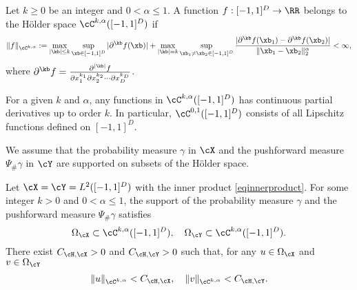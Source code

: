 \documentclass[11pt]{article} %
\begin{document}


\begin{definition}
	Let $k\geq 0$ be an integer and $0<\alpha\leq 1$. A function $f: [-1,1]^D\rightarrow \RR$ belongs to the H\"{o}lder space $\cC^{k,\alpha}([-1,1]^D)$ if
	\begin{align*}
		\|f\|_{\cC^{k,\alpha}}:= \max_{|\kb|\leq k}\sup\limits_{ \xb \in [-1,1]^D} |\partial^{\kb}f (\xb)| + \max\limits_{|\kb|=k}
		\sup\limits_{ \xb_1\neq \xb_2 \in [-1,1]^D}\frac{|\partial^{\kb}f(\xb_1)- \partial^{\kb}f (\xb_2)|}{\|\xb_1-\xb_2\|_2^{\alpha}} < \infty,
	\end{align*}
where $\partial^{\kb}f=\frac{\partial^{|\kb|} f}{\partial x_1^{k_1} \partial x_2^{k_2} \cdots \partial x_D^{k_D}}$.
\end{definition}

For a given $k$ and $\alpha$, any functions in $\cC^{k,\alpha}([-1,1]^D)$ has continuous partial derivatives up to order $k$. In particular, $\cC^{0,1}([-1,1]^D)$ consists of all Lipschitz functions defined on $[-1,1]^D$.

We assume that the probability measure $\gamma$ in $\cX$ and the pushforward measure $\Psi_{\#}\gamma$ in $\cY$ are supported on subsets of the H\"{o}lder space.


\begin{assumption}
\label{assum.holder.leg}
	Let $\cX=\cY=L^2([-1,1]^D)$ with the inner product \eqref{eqinnerproduct}. For some integer $k>0$ and $0<\alpha\leq 1$, the support of the probability measure $\gamma$ and the pushforward measure $\Psi_{\#}\gamma$ satisfies 
	$$\Omega_{\cX}\subset \cC^{k,\alpha}([-1,1]^D), \quad \Omega_{\cY}\subset \cC^{k,\alpha}([-1,1]^D).$$ There exist $C_{\cH,\cX}>0$ and $C_{\cH,\cY}>0$ such that, for any $u\in \Omega_{\cX}$ and $v\in \Omega_{\cY}$ 
	\begin{align*}
		\|u\|_{\cC^{k,\alpha}}<C_{\cH,\cX},\quad \|v\|_{\cC^{k,\alpha}}<C_{\cH,\cY}.
	\end{align*}
\end{assumption}
\end{document}
